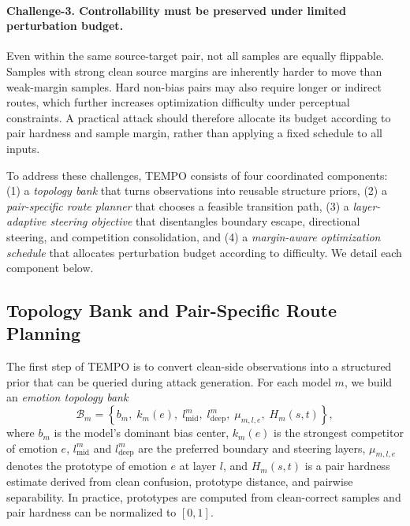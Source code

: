 \paragraph{Challenge-3. Controllability must be preserved under limited perturbation budget.}
Even within the same source-target pair, not all samples are equally flippable. Samples with strong clean source margins are inherently harder to move than weak-margin samples. Hard non-bias pairs may also require longer or indirect routes, which further increases optimization difficulty under perceptual constraints. A practical attack should therefore allocate its budget according to pair hardness and sample margin, rather than applying a fixed schedule to all inputs.

\noindent
To address these challenges, \textsc{TEMPO} consists of four coordinated components: (1) a \emph{topology bank} that turns observations into reusable structure priors, (2) a \emph{pair-specific route planner} that chooses a feasible transition path, (3) a \emph{layer-adaptive steering objective} that disentangles boundary escape, directional steering, and competition consolidation, and (4) a \emph{margin-aware optimization schedule} that allocates perturbation budget according to difficulty. We detail each component below.

\subsection{Topology Bank and Pair-Specific Route Planning}
\label{subsec:tempo-topology}

The first step of \textsc{TEMPO} is to convert clean-side observations into a structured prior that can be queried during attack generation. For each model $m$, we build an \emph{emotion topology bank}
\begin{equation}
\mathcal{B}_m =
\left\{
b_m,\;
k_m(e),\;
l^{m}_{\mathrm{mid}},\;
l^{m}_{\mathrm{deep}},\;
\mu_{m,l,e},\;
H_m(s,t)
\right\},
\end{equation}
where $b_m$ is the model's dominant bias center, $k_m(e)$ is the strongest competitor of emotion $e$, $l^{m}_{\mathrm{mid}}$ and $l^{m}_{\mathrm{deep}}$ are the preferred boundary and steering layers, $\mu_{m,l,e}$ denotes the prototype of emotion $e$ at layer $l$, and $H_m(s,t)$ is a pair hardness estimate derived from clean confusion, prototype distance, and pairwise separability. In practice, prototypes are computed from clean-correct samples and pair hardness can be normalized to $[0,1]$.

